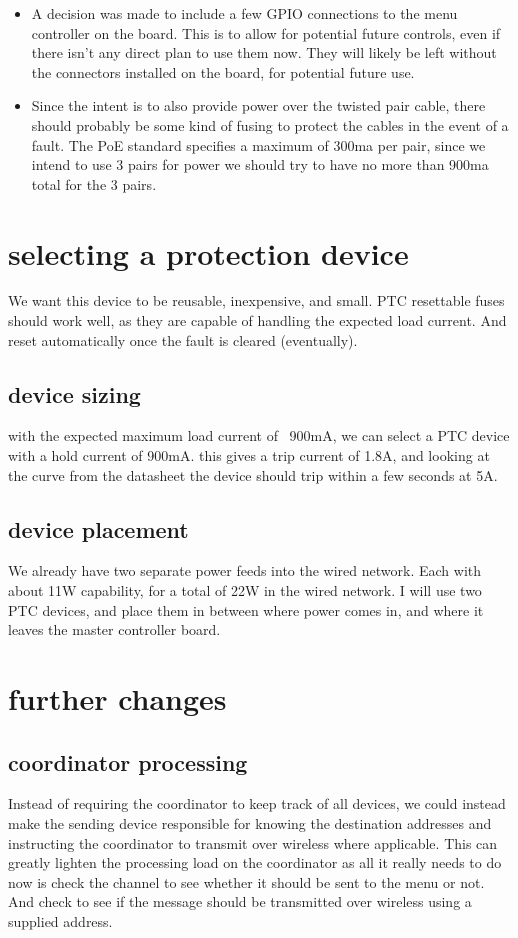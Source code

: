 \documentclass{article}
\begin{document}
\begin{itemize}
     \item A decision was made to include a few GPIO connections to the menu controller on the board.
     This is to allow for potential future controls, even if there isn't any direct plan to use them now.
     They will likely be left without the connectors installed on the board, for potential future use.
     
     \item Since the intent is to also provide power over the twisted pair cable, there should probably be some kind of fusing to protect the cables in the event of a fault.
     The PoE standard specifies a maximum of 300ma per pair, since we intend to use 3 pairs for power we should try to have no more than
     900ma total for the 3 pairs.
     
     \end{itemize}
     \section{selecting a protection device}
     We want this device to be reusable, inexpensive, and small.
     PTC resettable fuses should work well, as they are capable of handling the expected load current.
     And reset automatically once the fault is cleared (eventually).
     \subsection{device sizing}
     with the expected maximum load current of ~900mA, we can select a PTC device with a hold current of 900mA.
     this gives a trip current of 1.8A, and looking at the curve from the datasheet the device should trip within a few seconds at 5A.
     \subsection{device placement} 
     We already have two separate power feeds into the wired network.
     Each with about 11W capability, for a total of 22W in the wired network.
     I will use two PTC devices, and place them in between where power comes in, and where it leaves the master controller board.
     \section{further changes}
     \subsection{coordinator processing}
     Instead of requiring the coordinator to keep track of all devices, we could instead make the sending device responsible for
     knowing the destination addresses and instructing the coordinator to transmit over wireless where applicable.
     This can greatly lighten the processing load on the coordinator as all it really needs to do now is check the channel to see whether it should be sent to the menu or not.
     And check to see if the message should be transmitted over wireless using a supplied address.
\end{document}
